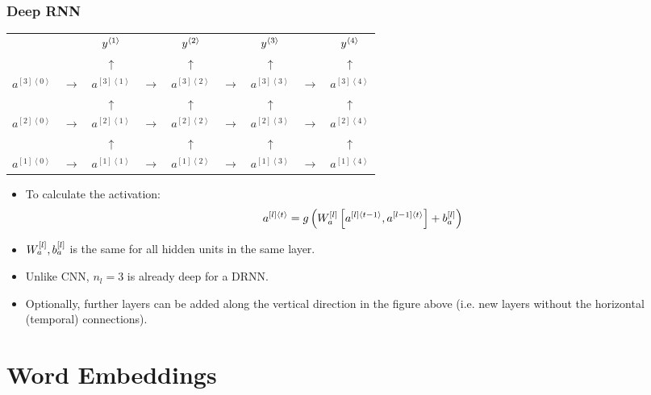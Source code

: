 \subsubsection{Deep RNN}
\newcommand{\drnnunit}[3]{#1^{\left[#2\right]\left\langle #3\right\rangle}}
\begin{center}
  \begin{tabular}{ccccccccc}
    && $y^{\left\langle 1\right\rangle}$ & & $y^{\left\langle 2\right\rangle}$ & & $y^{\left\langle 3\right\rangle}$ & & $y^{\left\langle 4\right\rangle}$\\
    && $\uparrow$ & &  $\uparrow$ & &  $\uparrow$ & &  $\uparrow$\\
    $\drnnunit{a}{3}{0}$ & $\rightarrow$ & $\boxed{\drnnunit{a}{3}{1}}$ & $\rightarrow$ & $\boxed{\drnnunit{a}{3}{2}}$ & $\rightarrow$ & $\boxed{\drnnunit{a}{3}{3}}$ & $\rightarrow$ & $\boxed{\drnnunit{a}{3}{4}}$ \\
    && $\uparrow$ & &  $\uparrow$ & &  $\uparrow$ & &  $\uparrow$\\
    $\drnnunit{a}{2}{0}$ & $\rightarrow$ & $\boxed{\drnnunit{a}{2}{1}}$ & $\rightarrow$ & $\boxed{\drnnunit{a}{2}{2}}$ & $\rightarrow$ & $\boxed{\drnnunit{a}{2}{3}}$ & $\rightarrow$ & $\boxed{\drnnunit{a}{2}{4}}$ \\
    && $\uparrow$ & &  $\uparrow$ & &  $\uparrow$ & &  $\uparrow$\\
    $\drnnunit{a}{1}{0}$ & $\rightarrow$ & $\boxed{\drnnunit{a}{1}{1}}$ & $\rightarrow$ & $\boxed{\drnnunit{a}{1}{2}}$ & $\rightarrow$ & $\boxed{\drnnunit{a}{1}{3}}$ & $\rightarrow$ & $\boxed{\drnnunit{a}{1}{4}}$ \\
  \end{tabular}
\end{center}
\begin{itemize}
  \item To calculate the activation:
  \begin{align*}
    \drnnunit{a}{l}{t}=g\left(\bracketss{W_a}{l}\left[\drnnunit{a}{l}{t-1},\drnnunit{a}{l-1}{t}\right]+\bracketss{b_a}{l}\right)
  \end{align*}
  \item $W_a^{\left[ l\right]},b_a^{\left[ l\right]}$ is the same for all hidden units in the same layer.
  \item Unlike CNN, $n_l=3$ is already deep for a DRNN.
  \item Optionally, further layers can be added along the vertical direction in the figure above (i.e. new layers without the horizontal (temporal) connections).
\end{itemize}
\section{Word Embeddings}
\newcommand{\embedding}[1]{\mathbf{e}_{#1}}
\newcommand{\onehot}[1]{\mathbf{o}_{#1}}
